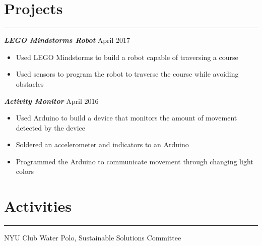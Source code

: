\documentclass[line, margin]{res}
\begin{document}
\begin{resume}
\section{Projects}
\vspace{.3em}
\hspace{-9.8em}
\rule{6.5in}{0.5pt}
\textit{\upshape \textbf{LEGO Mindstorms Robot}} \hfill April 2017\\ 
\begin{itemize}[noitemsep,nolistsep]
\item Used LEGO Mindstorms to build a robot capable of traversing a course
\item Used sensors to program the robot to traverse the course while avoiding obstacles
\end{itemize}
\textit{\upshape \textbf{Activity Monitor}} \hfill April 2016\\ 
\begin{itemize}[noitemsep,nolistsep]
\item Used Arduino to build a device that monitors the amount of movement detected by the device
\item Soldered an accelerometer and indicators to an Arduino 
\item Programmed the Arduino to communicate movement through changing light colors
\end{itemize}
                                                                        
\section{Activities}
\vspace{.3em}
\hspace{-9.8em}
\rule{6.5in}{0.5pt}
NYU Club Water Polo, Sustainable Solutions Committee

\end{resume}
\end{document}
